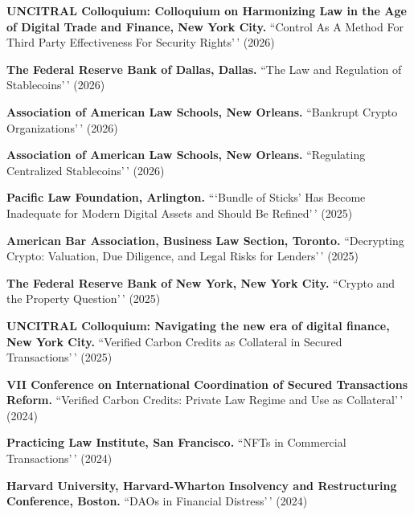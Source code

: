 \documentclass[
  11pt,
  letterpaper]{article}
\begin{document}
\vspace{0.8em}\noindent\textbf{UNCITRAL Colloquium: Colloquium on Harmonizing Law in the Age of Digital Trade and Finance, New York City.}
``Control As A Method For Third Party Effectiveness For Security
Rights'\,' (2026)

\vspace{0.8em}\noindent\textbf{The Federal Reserve Bank of Dallas, Dallas.}
``The Law and Regulation of Stablecoins'\,' (2026)

\vspace{0.8em}\noindent\textbf{Association of American Law Schools, New Orleans.}
``Bankrupt Crypto Organizations'\,' (2026)

\vspace{0.8em}\noindent\textbf{Association of American Law Schools, New Orleans.}
``Regulating Centralized Stablecoins'\,' (2026)

\vspace{0.8em}\noindent\textbf{Pacific Law Foundation, Arlington.}
```Bundle of Sticks' Has Become Inadequate for Modern Digital Assets and
Should Be Refined'\,' (2025)

\vspace{0.8em}\noindent\textbf{American Bar Association, Business Law Section, Toronto.}
``Decrypting Crypto: Valuation, Due Diligence, and Legal Risks for
Lenders'\,' (2025)

\vspace{0.8em}\noindent\textbf{The Federal Reserve Bank of New York, New York City.}
``Crypto and the Property Question'\,' (2025)

\vspace{0.8em}\noindent\textbf{UNCITRAL Colloquium: Navigating the new era of digital finance, New York City.}
``Verified Carbon Credits as Collateral in Secured Transactions'\,'
(2025)

\vspace{0.8em}\noindent\textbf{VII Conference on International Coordination of Secured Transactions Reform.}
``Verified Carbon Credits: Private Law Regime and Use as Collateral'\,'
(2024)

\vspace{0.8em}\noindent\textbf{Practicing Law Institute, San Francisco.}
``NFTs in Commercial Transactions'\,' (2024)

\vspace{0.8em}\noindent\textbf{Harvard University, Harvard-Wharton Insolvency and Restructuring Conference, Boston.}
``DAOs in Financial Distress'\,' (2024)
\end{document}
